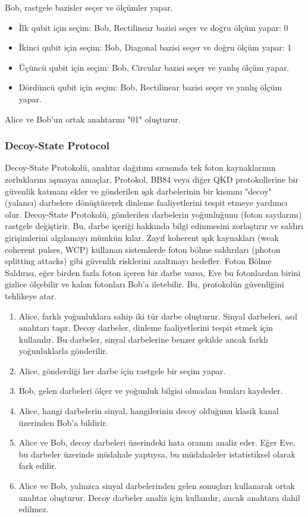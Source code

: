 Bob, rastgele bazisler seçer ve ölçümler yapar.

\begin{itemize}
    \item İlk qubit için seçim: Bob, Rectilinear bazisi seçer ve doğru ölçüm yapar: 0
    \item İkinci qubit için seçim: Bob, Diagonal bazisi seçer ve doğru ölçüm yapar: 1
    \item Üçüncü qubit için seçim: Bob, Circular bazisi seçer ve yanlış ölçüm yapar.
    \item Dördüncü qubit için seçim: Bob, Rectilinear bazisi seçer ve yanlış ölçüm yapar.
\end{itemize}

Alice ve Bob'un ortak anahtarını "01" oluşturur.

\newpage

\subsubsection{Decoy-State Protocol}

Decoy-State Protokolü, anahtar dağıtımı sırasında tek foton kaynaklarının zorluklarını aşmayaı amaçlar. Protokol, BB84 veya diğer QKD protokollerine bir güvenlik katmanı ekler ve gönderilen ışık darbelerinin bir kısmını "decoy" (yalancı) darbelere dönüştürerek dinleme faaliyetlerini tespit etmeye yardımcı olur. Decoy-State Protokolü, gönderilen darbelerin yoğunluğunu (foton sayılarını) rastgele değiştirir. Bu, darbe içeriği hakkında bilgi edinmesini zorlaştırır ve saldırı girişimlerini algılamayı mümkün kılar. Zayıf koherent ışık kaynakları (weak coherent pulses, WCP) kullanan sistemlerde foton bölme saldırıları (photon splitting attacks) gibi güvenlik risklerini azaltmayı hedefler. Foton Bölme Saldırısı, eğer birden fazla foton içeren bir darbe varsa, Eve bu fotonlardan birini gizlice ölçebilir ve kalan fotonları Bob'a iletebilir. Bu, protokolün güvenliğini tehlikeye atar.

\begin{enumerate}
    \item Alice, farklı yoğunluklara sahip iki tür darbe oluşturur. Sinyal darbeleri, asıl anahtarı taşır. Decoy darbeler, dinleme faaliyetlerini tespit etmek için kullanılır. Bu darbeler, sinyal darbelerine benzer şekilde ancak farklı yoğunluklarla gönderilir.
    \item Alice, gönderdiği her darbe için rastgele bir seçim yapar.
    \item Bob, gelen darbeleri ölçer ve yoğunluk bilgisi olmadan bunları kaydeder.
    \item Alice, hangi darbelerin sinyal, hangilerinin decoy olduğunu klasik kanal üzerinden Bob'a bildirir.
    \item Alice ve Bob, decoy darbeleri üzerindeki hata oranını analiz eder. Eğer Eve, bu darbeler üzerinde müdahale yaptıysa, bu müdahaleler istatistiksel olarak fark edilir.
    \item Alice ve Bob, yalnızca sinyal darbelerinden gelen sonuçları kullanarak ortak anahtar oluşturur. Decoy darbeler analiz için kullanılır, ancak anahtara dahil edilmez.
\end{enumerate}

